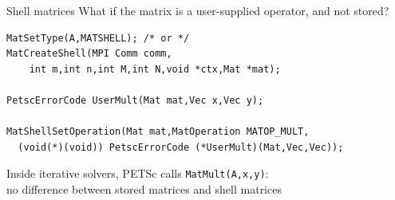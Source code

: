 
\begin{numberedframe}{Shell matrices}
What if the matrix is a user-supplied operator, and not stored?

\begin{lstlisting}
MatSetType(A,MATSHELL); /* or */
MatCreateShell(MPI Comm comm,
    int m,int n,int M,int N,void *ctx,Mat *mat);

PetscErrorCode UserMult(Mat mat,Vec x,Vec y);

MatShellSetOperation(Mat mat,MatOperation MATOP_MULT,
  (void(*)(void)) PetscErrorCode (*UserMult)(Mat,Vec,Vec));
\end{lstlisting}
Inside iterative solvers, PETSc calls \lstinline{MatMult(A,x,y)}: \\
no difference between stored matrices and shell matrices
\end{numberedframe}

